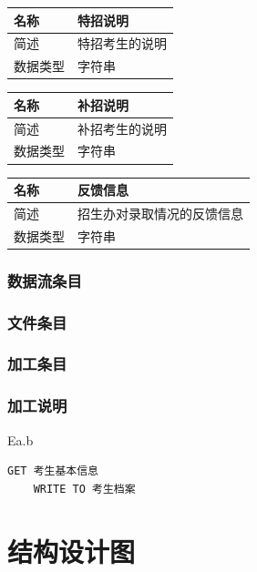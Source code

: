 \documentclass[CJK,utf8]{ctexrep}
\begin{document}
\begin{tabularx}{0.85\textwidth}{|l|X|}
	\hline
	名称 & 特招说明 \\
	\hline
	简述 & 特招考生的说明 \\
	\hline
	数据类型 & 字符串 \\
	\hline
\end{tabularx}

\begin{tabularx}{0.85\textwidth}{|l|X|}
	\hline
	名称 & 补招说明 \\
	\hline
	简述 & 补招考生的说明 \\
	\hline
	数据类型 & 字符串 \\
	\hline
\end{tabularx}

\begin{tabularx}{0.85\textwidth}{|l|X|}
	\hline
	名称 & 反馈信息 \\
	\hline
	简述 & 招生办对录取情况的反馈信息 \\
	\hline
	数据类型 & 字符串 \\
	\hline
\end{tabularx}

\subsubsection*{数据流条目}

\subsubsection*{文件条目}

\subsubsection*{加工条目}

\subsubsection*{加工说明}

Ea.b
\begin{lstlisting}[style=proc]
	GET 考生基本信息
	WRITE TO 考生档案
\end{lstlisting}

\section*{结构设计图}
\end{document}
